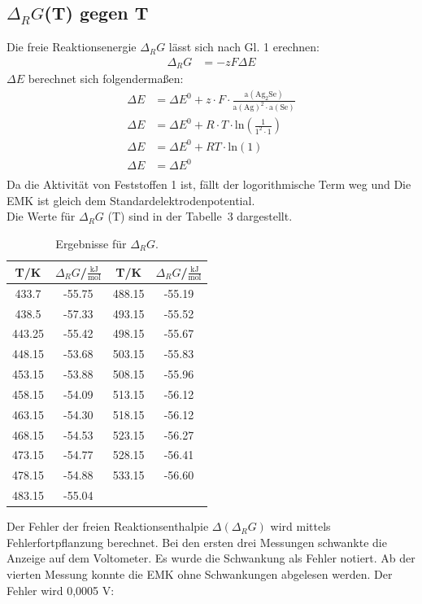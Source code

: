 \documentclass[12pt,a4paper,titlepage,headinclude,bibtotoc]{scrartcl}
\begin{document}
\subsection{$\Delta_R G$(T) gegen T}
Die freie Reaktionsenergie $\Delta_R G$ lässt sich nach Gl. 1 erechnen:
\begin{align}
\Delta_R G &= - z F \Delta E 
\end{align}
$\Delta E$ berechnet sich folgendermaßen:
\begin{align}
\Delta E &= \Delta E^0 + z\cdot F \cdot \frac{\text{a}(\text{Ag}_2\text{Se})}{\text{a}(\text{Ag})^2\cdot\text{a}(\text{Se})}\\
\Delta E &= \Delta E^0 + R\cdot T\cdot \text{ln}(\frac{1}{1^2\cdot1})\\
\Delta E &= \Delta E^0 + RT \cdot \text{ln}(1)\\
\Delta E &= \Delta E^0 \\
\end{align}
Da die Aktivität von Feststoffen 1 ist, fällt der logorithmische Term weg und Die EMK ist gleich dem Standardelektrodenpotential.\\
Die Werte für $\Delta_R G$ (T) sind in der Tabelle~3 dargestellt.
\begin{table}[h!]
\centering
\caption{Ergebnisse für $\Delta_R G$.}
\begin{tabular}{c|c||c|c}
T/\;K & $\Delta_R G$/\;$\frac{\text{kJ}}{\text{mol}}$ &T/\;K & $\Delta_R G$/\;$\frac{\text{kJ}}{\text{mol}}$\\ 
\hline
433.7 & -55.75 &488.15 & -55.19 \\ 
438.5 & -57.33 & 493.15& -55.52 \\
443.25 & -55.42 &  498.15& -55.67\\
448.15 & -53.68 & 503.15&  -55.83\\
453.15 & -53.88 & 508.15 & -55.96\\
458.15 & -54.09 & 513.15 & -56.12\\
463.15 & -54.30 & 518.15 & -56.12\\
468.15 & -54.53 & 523.15& -56.27\\
473.15 & -54.77 & 528.15 & -56.41\\
478.15 & -54.88 & 533.15& -56.60\\
483.15 & -55.04 &&\\
\end{tabular} 
\end{table}
\FloatBarrier
Der Fehler der freien Reaktionsenthalpie $\Delta(\Delta_R G)$  wird mittels Fehlerfortpflanzung berechnet. Bei den ersten drei Messungen schwankte die Anzeige auf dem Voltometer. Es wurde die Schwankung als Fehler notiert. Ab der vierten Messung konnte die EMK ohne Schwankungen abgelesen werden. Der Fehler wird 0,0005 V:
\end{document}

